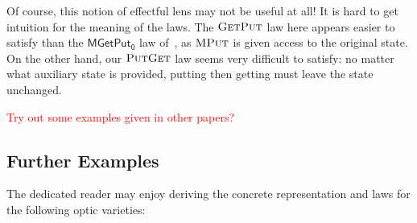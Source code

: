 \documentclass[11pt,letterpaper]{article}
\theoremstyle{plain}
\theoremstyle{definition}
\newcommand{\fget}{\textsc{Get}}
\newcommand{\fput}{\textsc{Put}}
\newcommand{\mput}{\textsc{MPut}}
\newcommand{\todo}[1]{\textcolor{red}{\small #1}}
\begin{document}
Of course, this notion of effectful lens may not be useful at all! It is hard to get intuition for the meaning of the laws. The $\fget\fput$ law here appears easier to satisfy than the $\mathsf{MGetPut_0}$ law of~\cite{ReflectionsOnMonadicLenses}, as $\mput$ is given access to the original state. On the other hand, our $\fput\fget$ law seems very difficult to satisfy: no matter what auxiliary state is provided, putting then getting must leave the state unchanged.

\todo{Try out some examples given in other papers?}

\subsection{Further Examples}
The dedicated reader may enjoy deriving the concrete representation and laws for the following optic varieties:
\end{document}

